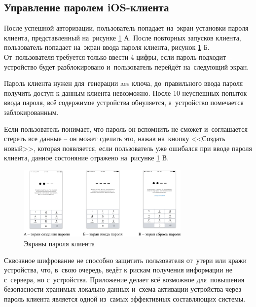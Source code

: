 \subsection{Управление паролем iOS-клиента}
\label{sec:usage:pin}

После успешной авторизации, пользователь попадает на~экран установки пароля клиента, представленный на~рисунке \ref{sec:usage:pin:ui} А. После повторных запусков клиента, пользователь попадает на~экран ввода пароля клиента, рисунок \ref{sec:usage:pin:ui} Б. От~пользователя требуется только ввести 4 цифры, если пароль подходит -- устройство будет разблокировано и~пользователь перейдёт на~следующий экран.

Пароль клиента нужен для~генерации \gls{aes} ключа, до~правильного ввода пароля получить доступ к данным клиента невозможно. После 10 неуспешных попыток ввода пароля, всё содержимое устройства обнуляется, а~устройство помечается заблокированным.

Если пользователь понимает, что пароль он вспомнить не сможет и~соглашается стереть все данные -- он может сделать это, нажав на~кнопку <<Создать новый>>, которая появляется, если пользователь уже ошибался при вводе пароля клиента, данное состоняние отражено на~рисунке \ref{sec:usage:pin:ui} В.

\begin{figure}[h]
  \centering
    \includegraphics[width=0.75\textwidth]{inc/img/ui/pin_combined.jpg}
  \caption{Экраны пароля клиента}
  \label{sec:usage:pin:ui}
\end{figure}

Сквозвное шифрование не способно защитить пользователя от~утери или кражи устройства, что, в~свою очередь, ведёт к рискам получения информации не с~сервера, но с~устройства. Приложение делает всё возможное для~повышения безопасности хранимых локально данных и~схема активации устройства через пароль клиента является одной из~самых эффективных составляющих системы.